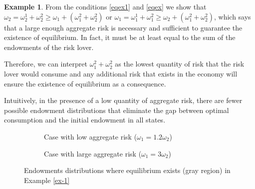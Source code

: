 \documentclass[pdftex]{article}
\numberwithin{equation}{section}
\theoremstyle{th}
\newtheorem{proof lemma}{{Proof Lemma}.}
\theoremstyle{definition}
\newtheorem{example}{Example}%
\newtheorem*{risk lovers}{Risk lovers}
\newtheorem*{risk averse}{Risk averse}
\begin{document}
\begin{example}
From the conditions \ref{eqex1} and \ref{eqex} we show that $\omega_2=\omega^1_2+\omega^2_2\geq\omega_1+\left(\omega^2_1+\omega^2_2\right)$ or $\omega_1=\omega^1_1+\omega^2_1\geq\omega_2+\left(\omega^2_1+\omega^2_2\right)$,
which says that a large enough aggregate risk is necessary and sufficient to guarantee the existence of equilibrium. In fact, it must be at least equal to the sum of the endowments of the risk lover.
\end{example}




Therefore, we can interpret $\omega^2_1+\omega^2_2$ as the lowest quantity of risk that the risk lover would consume and any additional risk that exists in the economy will ensure the existence of equilibrium as a consequence.

Intuitively, in the presence of a low quantity of aggregate risk, there are fewer possible endowment distributions that eliminate the gap between optimal consumption and the initial endowment in all states.


\begin{figure}[h]
\begin{center}
\begin{subfigure}[b]{0.3\textwidth}
\caption{Case with low aggregate risk ($\omega_1=1.2\omega_2$)\label{fig1a}}\vspace{-0.37cm}
\end{subfigure}
\hspace{1.0cm}
\begin{subfigure}[b]{0.6\textwidth}
\caption{Case with large aggregate risk ($\omega_1=3\omega_2$)\label{fig1b}}
\end{subfigure}
\end{center}\caption{Endowments distributions where equilibrium exists (gray region) in Example \ref{ex-1} \label{fig1}}
\end{figure}
\end{document}
